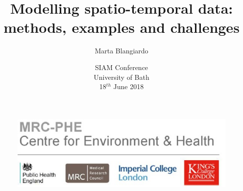 \documentclass[slidestop,compress,serif,10pt]{beamer}
\title[]{Modelling spatio-temporal data: methods, examples and challenges}
\author[Marta Blangiardo]{Marta Blangiardo}
\institute[]{Imperial College London \\ MRC-PHE Centre for Environment and Health\\
\scriptsize m.blangiardo@imperial.ac.uk\\
\vspace{12pt}
}
\date[]{SIAM Conference\\ University of Bath\\ 18$^{th}$ June 2018}
\begin{document}
\begin{frame}
\maketitle
\begin{center}
\begin{figure}
\includegraphics[scale=0.4]{LogoNew.jpg}
\end{figure}
\end{center}
\end{frame}

\end{document}
